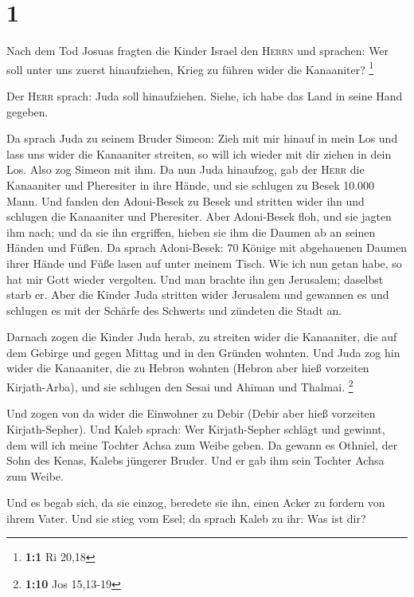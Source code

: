 \hypertarget{section}{%
\section{1}\label{section}}

 Nach dem Tod Josuas fragten die Kinder Israel den
\textsc{Herrn} und sprachen: Wer soll unter uns zuerst hinaufziehen,
Krieg zu führen wider die Kanaaniter? \footnote{\textbf{1:1} Ri 20,18}

 Der \textsc{Herr} sprach: Juda soll hinaufziehen. Siehe,
ich habe das Land in seine Hand gegeben.

 Da sprach Juda zu seinem Bruder Simeon: Zieh mit mir
hinauf in mein Los und lass uns wider die Kanaaniter streiten, so will
ich wieder mit dir ziehen in dein Los. Also zog Simeon mit ihm.
 Da nun Juda hinaufzog, gab der \textsc{Herr} die
Kanaaniter und Pheresiter in ihre Hände, und sie schlugen zu Besek
10.000 Mann.  Und fanden den Adoni-Besek zu Besek und
stritten wider ihn und schlugen die Kanaaniter und Pheresiter.
 Aber Adoni-Besek floh, und sie jagten ihm nach; und da
sie ihn ergriffen, hieben sie ihm die Daumen ab an seinen Händen und
Füßen.  Da sprach Adoni-Besek: 70 Könige mit abgehauenen
Daumen ihrer Hände und Füße lasen auf unter meinem Tisch. Wie ich nun
getan habe, so hat mir Gott wieder vergolten. Und man brachte ihn gen
Jerusalem; daselbst starb er.  Aber die Kinder Juda
stritten wider Jerusalem und gewannen es und schlugen es mit der Schärfe
des Schwerts und zündeten die Stadt an.

 Darnach zogen die Kinder Juda herab, zu streiten wider
die Kanaaniter, die auf dem Gebirge und gegen Mittag und in den Gründen
wohnten.  Und Juda zog hin wider die Kanaaniter, die zu
Hebron wohnten (Hebron aber hieß vorzeiten Kirjath-Arba), und sie
schlugen den Sesai und Ahiman und Thalmai. \footnote{\textbf{1:10} Jos
  15,13-19}

 Und zogen von da wider die Einwohner zu Debir (Debir
aber hieß vorzeiten Kirjath-Sepher).  Und Kaleb sprach:
Wer Kirjath-Sepher schlägt und gewinnt, dem will ich meine Tochter Achsa
zum Weibe geben.  Da gewann es Othniel, der Sohn des
Kenas, Kalebs jüngerer Bruder. Und er gab ihm sein Tochter Achsa zum
Weibe.

 Und es begab sich, da sie einzog, beredete sie ihn,
einen Acker zu fordern von ihrem Vater. Und sie stieg vom Esel; da
sprach Kaleb zu ihr: Was ist dir?

